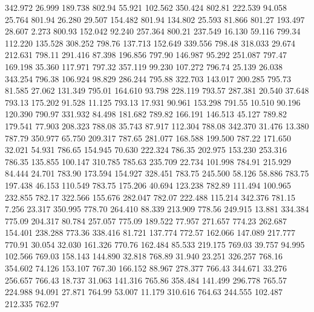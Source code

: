  342.972   26.999  189.738       802.94
  55.921  102.562  350.424       802.81
 222.539   94.058   25.764       801.94
  26.280   29.507  154.482       801.94
 134.802   25.593   81.866       801.27
 193.497   28.607    2.273       800.93
 152.042   92.240  257.364       800.21
 237.549   16.130   59.116       799.34
 112.220  135.528  308.252       798.76
 137.713  152.649  339.556       798.48
 318.033   29.674  212.631       798.11
 291.416   87.398  196.856       797.90
 146.987   95.292  251.087       797.47
 169.198   35.360  117.971       797.32
 357.119   99.230  107.272       796.74
  25.139   26.038  343.254       796.38
 106.924   98.829  286.244       795.88
 322.703  143.017  200.285       795.73
  81.585   27.062  131.349       795.01
 164.610   93.798  228.119       793.57
 287.381   20.540   37.648       793.13
 175.202   91.528   11.125       793.13
  17.931   90.961  153.298       791.55
  10.510   90.196  120.390       790.97
 331.932   84.498  181.682       789.82
 166.191  146.513   45.127       789.82
 179.541   77.903  208.323       788.08
  35.743   87.917  112.304       788.08
 342.370   31.476   13.380       787.79
 350.977   65.750  209.317       787.65
 281.077  168.588  199.500       787.22
 171.650   32.021   54.931       786.65
 154.945   70.630  222.324       786.35
 202.975  153.230  253.316       786.35
 135.855  100.147  310.785       785.63
 235.709   22.734  101.998       784.91
 215.929   84.444   24.701       783.90
 173.594  154.927  328.451       783.75
 245.500   58.126   58.886       783.75
 197.438   46.153  110.549       783.75
 175.206   40.694  123.238       782.89
 111.494  100.965  232.855       782.17
 322.566  155.676  282.047       782.07
 222.488  115.214  342.376       781.15
   7.256   23.317  350.995       778.70
 264.410   88.339  213.909       778.56
 249.915   13.881  334.384       775.09
 204.317   80.784  257.057       775.09
 189.522   77.957  271.657       774.23
 262.687  154.401  238.288       773.36
 338.416   81.721  137.774       772.57
 162.066  147.089  217.777       770.91
  30.054   32.030  161.326       770.76
 162.484   85.533  219.175       769.03
  39.757   94.995  102.566       769.03
 158.143  144.890   32.818       768.89
  31.940   23.251  326.257       768.16
 354.602   74.126  153.107       767.30
 166.152   88.967  278.377       766.43
 344.671   33.276  256.657       766.43
  18.737   31.063  141.316       765.86
 358.484  141.499  296.778       765.57
 224.988   94.091   27.871       764.99
  53.007   11.179  310.616       764.63
 244.555  102.487  212.335       762.97
